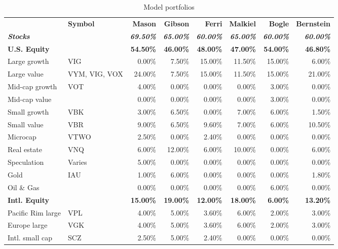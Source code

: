 \begin{table}[ht]
\caption{Model portfolios}
\centering
\begin{tabular}{l l r r r r r r}
\\\hline
\\\hline
& \textbf{Symbol} & \textbf{Mason} & \textbf{Gibson} & \textbf{Ferri} & \textbf{Malkiel} & \textbf{Bogle} & \textbf{Bernstein}\\
\hline
\textbf{\emph{Stocks}} & & \textbf{\emph{69.50\%}} & \textbf{\emph{65.00\%}} & \textbf{\emph{60.00\%}} & \textbf{\emph{65.00\%}} & \textbf{\emph{60.00\%}} & \textbf{\emph{60.00\%}}\\
\textbf{U.S. Equity} & & \textbf{54.50\%} & \textbf{46.00\%} & \textbf{48.00\%} & \textbf{47.00\%} & \textbf{54.00\%} & \textbf{46.80\%}\\
Large growth & VIG & 0.00\% & 7.50\% & 15.00\% & 11.50\% & 15.00\% & 6.00\%\\
Large value & VYM, VIG, VOX & 24.00\% & 7.50\% & 15.00\% & 11.50\% & 15.00\% & 21.00\%\\
Mid-cap growth & VOT & 4.00\% & 0.00\% & 0.00\% & 0.00\% & 3.00\% & 0.00\%\\
Mid-cap value & & 0.00\% & 0.00\% & 0.00\% & 0.00\% & 3.00\% & 0.00\%\\
Small growth & VBK & 3.00\% & 6.50\% & 0.00\% & 7.00\% & 6.00\% & 1.50\%\\
Small value & VBR & 9.00\% & 6.50\% & 9.60\% & 7.00\% & 6.00\% & 10.50\%\\
Microcap & VTWO & 2.50\% & 0.00\% & 2.40\% & 0.00\% & 0.00\% & 0.00\%\\
Real estate & VNQ & 6.00\% & 12.00\% & 6.00\% & 10.00\% & 0.00\% & 6.00\%\\
Speculation & Varies & 5.00\% & 0.00\% & 0.00\% & 0.00\% & 0.00\% & 0.00\%\\
Gold & IAU & 1.00\% & 6.00\% & 0.00\% & 0.00\% & 0.00\% & 1.80\%\\
Oil \& Gas & & 0.00\% & 0.00\% & 0.00\% & 0.00\% & 6.00\% & 0.00\%\\
\textbf{Intl. Equity} & & \textbf{15.00\%} & \textbf{19.00\%} & \textbf{12.00\%} & \textbf{18.00\%} & \textbf{6.00\%} & \textbf{13.20\%}\\
Pacific Rim large & VPL & 4.00\% & 5.00\% & 3.60\% & 6.00\% & 2.00\% & 3.00\%\\
Europe large & VGK & 4.00\% & 5.00\% & 3.60\% & 6.00\% & 2.00\% & 3.00\%\\
Intl. small cap & SCZ & 2.50\% & 5.00\% & 2.40\% & 0.00\% & 0.00\% & 0.00\%\\

\end{tabular}
\end{table}
